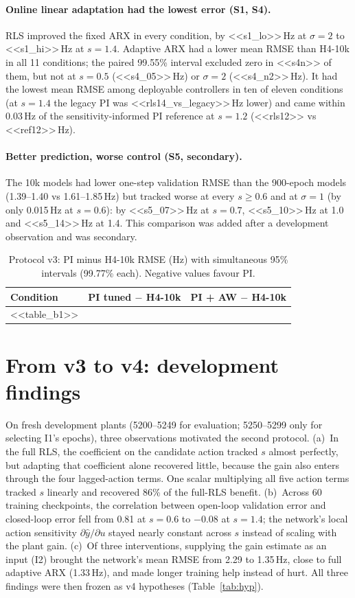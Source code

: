 \documentclass[11pt]{article}
\newcommand{\Hz}{\,Hz}
\begin{document}
\paragraph{Online linear adaptation had the lowest error (S1, S4).} RLS improved the fixed ARX in every condition, by <<s1_lo>>\Hz{} at $\sigma=2$ to <<s1_hi>>\Hz{} at $s=1.4$. Adaptive ARX had a lower mean RMSE than H4-10k in all 11 conditions; the paired 99.55\% interval excluded zero in <<s4n>> of them, but not at $s=0.5$ (<<s4_05>>\Hz) or $\sigma=2$ (<<s4_n2>>\Hz). It had the lowest mean RMSE among deployable controllers in ten of eleven conditions (at $s=1.4$ the legacy PI was <<rls14_vs_legacy>>\Hz{} lower) and came within 0.03\Hz{} of the sensitivity-informed PI reference at $s=1.2$ (<<rls12>> vs <<ref12>>\Hz).

\paragraph{Better prediction, worse control (S5, secondary).} The 10k models had lower one-step validation RMSE than the 900-epoch models (1.39--1.40 vs 1.61--1.85\Hz) but tracked worse at every $s\ge0.6$ and at $\sigma=1$ (by only 0.015\Hz{} at $s=0.6$): by <<s5_07>>\Hz{} at $s=0.7$, <<s5_10>>\Hz{} at 1.0 and <<s5_14>>\Hz{} at 1.4. This comparison was added after a development observation and was secondary.

\begin{table}[t]\centering\small
\caption{Protocol v3: PI minus H4-10k RMSE (Hz) with simultaneous 95\% intervals (99.77\% each). Negative values favour PI.}\label{tab:b1}
\begin{tabular}{@{}lll@{}}\toprule
Condition & PI tuned $-$ H4-10k & PI + AW $-$ H4-10k\\\midrule
<<table_b1>>
\bottomrule\end{tabular}\end{table}

\section{From v3 to v4: development findings}
On fresh development plants (5200--5249 for evaluation; 5250--5299 only for selecting I1's epochs), three observations motivated the second protocol. (a)~In the full RLS, the coefficient on the candidate action tracked $s$ almost perfectly, but adapting that coefficient alone recovered little, because the gain also enters through the four lagged-action terms. One scalar multiplying all five action terms tracked $s$ linearly and recovered 86\% of the full-RLS benefit. (b)~Across 60 training checkpoints, the correlation between open-loop validation error and closed-loop error fell from 0.81 at $s=0.6$ to $-0.08$ at $s=1.4$; the network's local action sensitivity $\partial\hat y/\partial u$ stayed nearly constant across $s$ instead of scaling with the plant gain. (c)~Of three interventions, supplying the gain estimate as an input (I2) brought the network's mean RMSE from 2.29 to 1.35\Hz, close to full adaptive ARX (1.33\Hz), and made longer training help instead of hurt. All three findings were then frozen as v4 hypotheses (Table~\ref{tab:hyp}).
\end{document}
